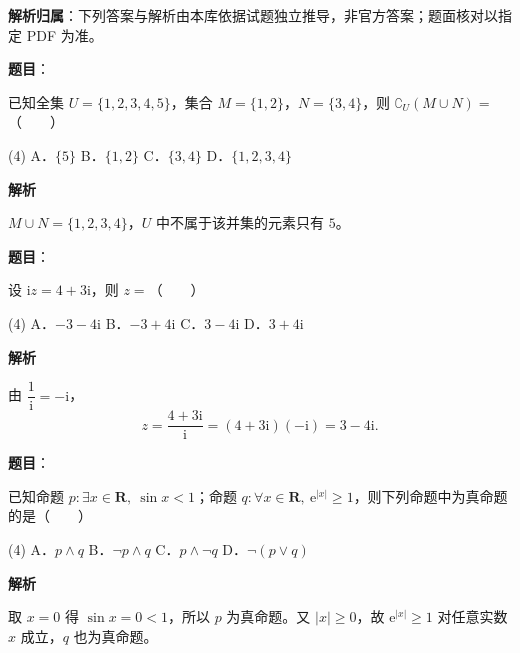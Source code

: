 

\begin{gknotice}
\textbf{解析归属}：下列答案与解析由本库依据试题独立推导，非官方答案；题面核对以指定 PDF 为准。
\end{gknotice}


\begin{answer}

\textbf{题目}：

已知全集 $U=\{1,2,3,4,5\}$，集合 $M=\{1,2\}$，$N=\{3,4\}$，则 $\complement_U(M\cup N)=$\mbox{（　　）}

\begin{gkopts}(4)
\task A．$\{5\}$
\task B．$\{1,2\}$
\task C．$\{3,4\}$
\task D．$\{1,2,3,4\}$
\end{gkopts}

\textbf{解析}

$M\cup N=\{1,2,3,4\}$，$U$ 中不属于该并集的元素只有 $5$。


\end{answer}
\begin{answer}

\textbf{题目}：

设 $\mathrm iz=4+3\mathrm i$，则 $z=$\mbox{（　　）}

\begin{gkopts}(4)
\task A．$-3-4\mathrm i$
\task B．$-3+4\mathrm i$
\task C．$3-4\mathrm i$
\task D．$3+4\mathrm i$
\end{gkopts}

\textbf{解析}

由 $\dfrac1{\mathrm i}=-\mathrm i$，
\nopagebreak[4]
\[
z=\frac{4+3\mathrm i}{\mathrm i}=(4+3\mathrm i)(-\mathrm i)=3-4\mathrm i.
\]


\end{answer}
\begin{answer}

\textbf{题目}：

已知命题 $p:\exists x\in\mathbf R,\ \sin x<1$；命题 $q:\forall x\in\mathbf R,\ \mathrm e^{|x|}\geqslant1$，则下列命题中为真命题的是\mbox{（　　）}

\begin{gkopts}(4)
\task A．$p\land q$
\task B．$\neg p\land q$
\task C．$p\land\neg q$
\task D．$\neg(p\lor q)$
\end{gkopts}

\textbf{解析}

取 $x=0$ 得 $\sin x=0<1$，所以 $p$ 为真命题。又 $|x|\geqslant0$，故 $\mathrm e^{|x|}\geqslant1$ 对任意实数 $x$ 成立，$q$ 也为真命题。


\end{answer}
